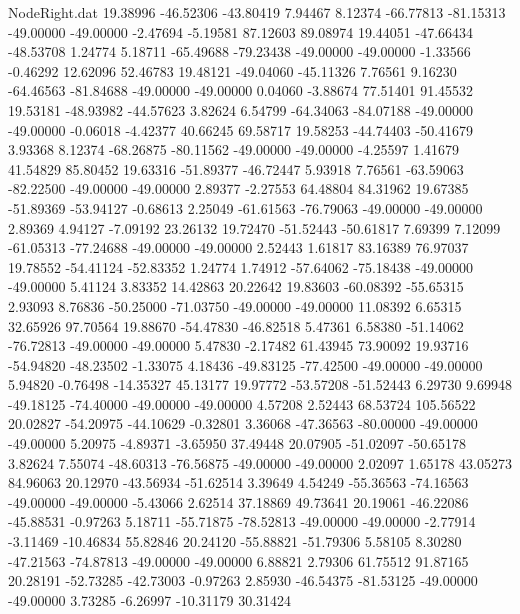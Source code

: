 \begin{filecontents}{NodeRight.dat}
  19.38996  -46.52306  -43.80419     7.94467    8.12374  -66.77813  -81.15313  -49.00000  -49.00000   -2.47694   -5.19581   87.12603   89.08974
  19.44051  -47.66434  -48.53708     1.24774    5.18711  -65.49688  -79.23438  -49.00000  -49.00000   -1.33566   -0.46292   12.62096   52.46783
  19.48121  -49.04060  -45.11326     7.76561    9.16230  -64.46563  -81.84688  -49.00000  -49.00000    0.04060   -3.88674   77.51401   91.45532
  19.53181  -48.93982  -44.57623     3.82624    6.54799  -64.34063  -84.07188  -49.00000  -49.00000   -0.06018   -4.42377   40.66245   69.58717
  19.58253  -44.74403  -50.41679     3.93368    8.12374  -68.26875  -80.11562  -49.00000  -49.00000   -4.25597    1.41679   41.54829   85.80452
  19.63316  -51.89377  -46.72447     5.93918    7.76561  -63.59063  -82.22500  -49.00000  -49.00000    2.89377   -2.27553   64.48804   84.31962
  19.67385  -51.89369  -53.94127    -0.68613    2.25049  -61.61563  -76.79063  -49.00000  -49.00000    2.89369    4.94127   -7.09192   23.26132
  19.72470  -51.52443  -50.61817     7.69399    7.12099  -61.05313  -77.24688  -49.00000  -49.00000    2.52443    1.61817   83.16389   76.97037
  19.78552  -54.41124  -52.83352     1.24774    1.74912  -57.64062  -75.18438  -49.00000  -49.00000    5.41124    3.83352   14.42863   20.22642
  19.83603  -60.08392  -55.65315     2.93093    8.76836  -50.25000  -71.03750  -49.00000  -49.00000   11.08392    6.65315   32.65926   97.70564
  19.88670  -54.47830  -46.82518     5.47361    6.58380  -51.14062  -76.72813  -49.00000  -49.00000    5.47830   -2.17482   61.43945   73.90092
  19.93716  -54.94820  -48.23502    -1.33075    4.18436  -49.83125  -77.42500  -49.00000  -49.00000    5.94820   -0.76498  -14.35327   45.13177
  19.97772  -53.57208  -51.52443     6.29730    9.69948  -49.18125  -74.40000  -49.00000  -49.00000    4.57208    2.52443   68.53724  105.56522
  20.02827  -54.20975  -44.10629    -0.32801    3.36068  -47.36563  -80.00000  -49.00000  -49.00000    5.20975   -4.89371   -3.65950   37.49448
  20.07905  -51.02097  -50.65178     3.82624    7.55074  -48.60313  -76.56875  -49.00000  -49.00000    2.02097    1.65178   43.05273   84.96063
  20.12970  -43.56934  -51.62514     3.39649    4.54249  -55.36563  -74.16563  -49.00000  -49.00000   -5.43066    2.62514   37.18869   49.73641
  20.19061  -46.22086  -45.88531    -0.97263    5.18711  -55.71875  -78.52813  -49.00000  -49.00000   -2.77914   -3.11469  -10.46834   55.82846
  20.24120  -55.88821  -51.79306     5.58105    8.30280  -47.21563  -74.87813  -49.00000  -49.00000    6.88821    2.79306   61.75512   91.87165
  20.28191  -52.73285  -42.73003    -0.97263    2.85930  -46.54375  -81.53125  -49.00000  -49.00000    3.73285   -6.26997  -10.31179   30.31424

\end{filecontents}

